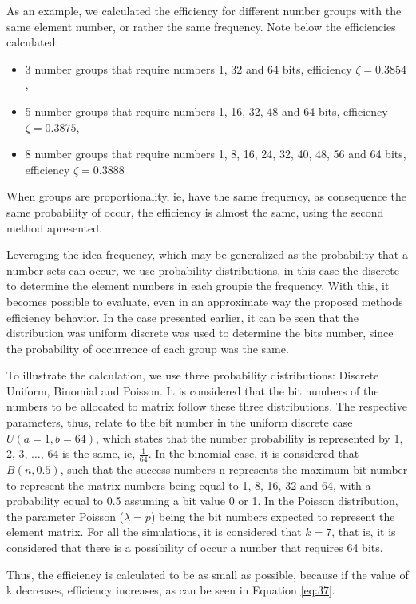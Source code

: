 \documentclass[10pt]{article}
\begin{document}
As an example, we calculated the efficiency for different number groups with the same element number, or rather the same frequency. Note below the efficiencies calculated:

\begin{itemize}
  \item 3 number groups that require numbers 1, 32 and 64 bits, efficiency $\zeta=0.3854$,
  \item 5 number groups that require numbers 1, 16, 32, 48 and 64 bits, efficiency $\zeta=0.3875$,
  \item 8 number groups that require numbers 1, 8, 16, 24, 32, 40, 48, 56 and 64 bits, efficiency $\zeta=0.3888$
\end{itemize}

When groups are proportionality, ie, have the same frequency, as consequence the same probability of occur, the efficiency is almost the same, using the second method apresented.

Leveraging the idea frequency, which may be generalized as the probability that a number sets can occur, we use probability distributions, in this case the discrete to determine the element numbers in each groupie the frequency. With this, it becomes possible to evaluate, even in an approximate way the proposed methods efficiency behavior. In the case presented earlier, it can be seen that the distribution was uniform discrete was used to determine the bits number, since the probability of occurrence of each group was the same.

To illustrate the calculation, we use three probability distributions: Discrete Uniform, Binomial and Poisson. It is considered that the bit numbers of the numbers to be allocated to matrix follow these three distributions. The respective parameters, thus, relate to the bit number in the uniform discrete case $U(a=1,b=64)$, which states that the number probability is represented by 1, 2, 3, $\ldots$, 64 is the same, ie, $\frac{1}{64}$. In the binomial case, it is considered that $B(n,0.5)$, such that the success numbers n represents the maximum bit number to represent the matrix numbers being equal to 1, 8, 16, 32 and 64, with a probability equal to 0.5 assuming a bit value 0 or 1. In the Poisson distribution, the parameter Poisson ($\lambda=p$) being the bit numbers expected to represent the element matrix. For all the simulations, it is considered that $k=7$, that is, it is considered that there is a possibility of occur a number that requires 64 bits.

Thus, the efficiency is calculated to be as small as possible, because if the value of k decreases, efficiency increases, as can be seen in Equation \ref{eq:37}.
\end{document}
